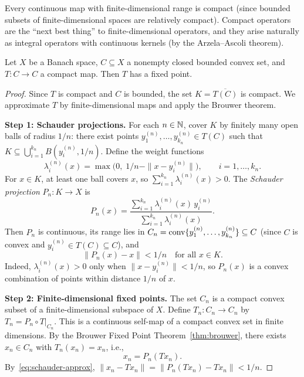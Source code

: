 \documentclass[11pt,a4paper]{article}
\begin{document}
\begin{remark}
\label{rem:compact-finite-rank}
Every continuous map with finite-dimensional range is compact (since
bounded subsets of finite-dimensional spaces are relatively compact).
Compact operators are the ``next best thing'' to
finite-dimensional operators, and they arise naturally as integral
operators with continuous kernels (by the Arzela--Ascoli theorem).
\end{remark}

\begin{theorem}
\label{thm:schauder}
Let $X$ be a Banach space, $C \subseteq X$ a nonempty closed bounded
convex set, and $T \colon C \to C$ a compact map.  Then $T$ has a
fixed point.
\end{theorem}

\begin{proof}
Since $T$ is compact and $C$ is bounded, the set $K = \overline{T(C)}$
is compact.  We approximate $T$ by finite-dimensional maps and apply
the Brouwer theorem.

\textbf{Step 1: Schauder projections.}
For each $n \in \mathbb{N}$, cover $K$ by finitely many open balls of radius
$1/n$: there exist points $y_1^{(n)}, \ldots, y_{k_n}^{(n)} \in T(C)$
such that $K \subseteq \bigcup_{i=1}^{k_n} B(y_i^{(n)}, 1/n)$.
Define the weight functions
\[
    \lambda_i^{(n)}(x)
    = \max\!\bigl(0,\; 1/n - \|x - y_i^{(n)}\|\bigr),
    \qquad i = 1, \ldots, k_n.
\]
For $x \in K$, at least one ball covers $x$, so
$\sum_{i=1}^{k_n} \lambda_i^{(n)}(x) > 0$.  The
\emph{Schauder projection} $P_n \colon K \to X$ is
\[
    P_n(x)
    = \frac{\sum_{i=1}^{k_n} \lambda_i^{(n)}(x)\, y_i^{(n)}}
           {\sum_{i=1}^{k_n} \lambda_i^{(n)}(x)}.
\]
Then $P_n$ is continuous, its range lies in
$C_n = \operatorname{conv}\{y_1^{(n)}, \ldots, y_{k_n}^{(n)}\} \subseteq C$ (since
$C$ is convex and $y_i^{(n)} \in T(C) \subseteq C$), and
\begin{equation}
\label{eq:schauder-approx}
    \|P_n(x) - x\| < 1/n
    \quad \text{for all } x \in K.
\end{equation}
Indeed, $\lambda_i^{(n)}(x) > 0$ only when
$\|x - y_i^{(n)}\| < 1/n$, so $P_n(x)$ is a convex combination of
points within distance $1/n$ of $x$.

\textbf{Step 2: Finite-dimensional fixed points.}
The set $C_n$ is a compact convex subset of a finite-dimensional
subspace of $X$.  Define $T_n \colon C_n \to C_n$ by
$T_n = P_n \circ T|_{C_n}$.  This is a continuous self-map of a
compact convex set in finite dimensions.  By the Brouwer Fixed Point
Theorem~\ref{thm:brouwer}, there exists $x_n \in C_n$ with
$T_n(x_n) = x_n$, i.e.,
\[
    x_n = P_n(Tx_n).
\]
By~\eqref{eq:schauder-approx},
$\|x_n - Tx_n\| = \|P_n(Tx_n) - Tx_n\| < 1/n$.


\end{proof}
\end{document}

